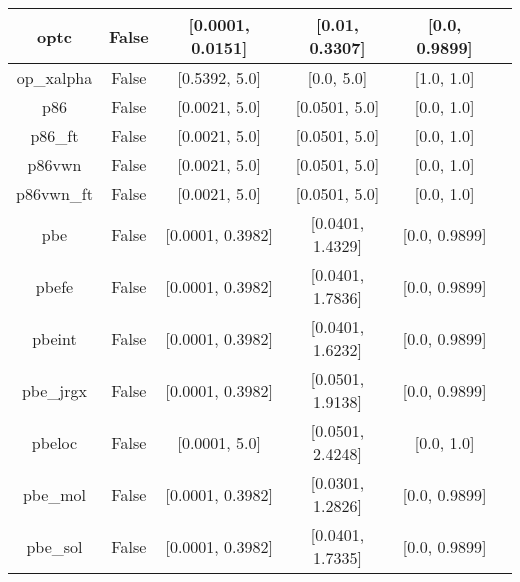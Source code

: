 \begin{tabular}{|c|c|c|c|c|l|}
          optc &                 False & [0.0001, 0.0151] &   [0.01, 0.3307] &    [0.0, 0.9899] &                                           \cite{Cohen2001_607} \\ \hline
    op\_xalpha &                 False &    [0.5392, 5.0] &       [0.0, 5.0] &       [1.0, 1.0] &                      \cite{Tsuneda1999_10664,Tsuneda1999_5656} \\ \hline
           p86 &                 False &    [0.0021, 5.0] &    [0.0501, 5.0] &       [0.0, 1.0] &                                         \cite{Perdew1986_8822} \\ \hline
       p86\_ft &                 False &    [0.0021, 5.0] &    [0.0501, 5.0] &       [0.0, 1.0] &                                         \cite{Perdew1986_8822} \\ \hline
        p86vwn &                 False &    [0.0021, 5.0] &    [0.0501, 5.0] &       [0.0, 1.0] &                                         \cite{Perdew1986_8822} \\ \hline
    p86vwn\_ft &                 False &    [0.0021, 5.0] &    [0.0501, 5.0] &       [0.0, 1.0] &                                         \cite{Perdew1986_8822} \\ \hline
           pbe &                 False & [0.0001, 0.3982] & [0.0401, 1.4329] &    [0.0, 0.9899] &                     \cite{Perdew1996_3865,Perdew1996_3865_err} \\ \hline
         pbefe &                 False & [0.0001, 0.3982] & [0.0401, 1.7836] &    [0.0, 0.9899] &                                          \cite{Perez2015_3844} \\ \hline
        pbeint &                 False & [0.0001, 0.3982] & [0.0401, 1.6232] &    [0.0, 0.9899] &                                      \cite{Fabiano2010_113104} \\ \hline
     pbe\_jrgx &                 False & [0.0001, 0.3982] & [0.0501, 1.9138] &    [0.0, 0.9899] &                                      \cite{Pedroza2009_201106} \\ \hline
        pbeloc &                 False &    [0.0001, 5.0] & [0.0501, 2.4248] &       [0.0, 1.0] &                                   \cite{Constantin2012_035130} \\ \hline
      pbe\_mol &                 False & [0.0001, 0.3982] & [0.0301, 1.2826] &    [0.0, 0.9899] &                                     \cite{delCampo2012_104108} \\ \hline
      pbe\_sol &                 False & [0.0001, 0.3982] & [0.0401, 1.7335] &    [0.0, 0.9899] &                                       \cite{Perdew2008_136406} \\ \hline

\end{tabular}
